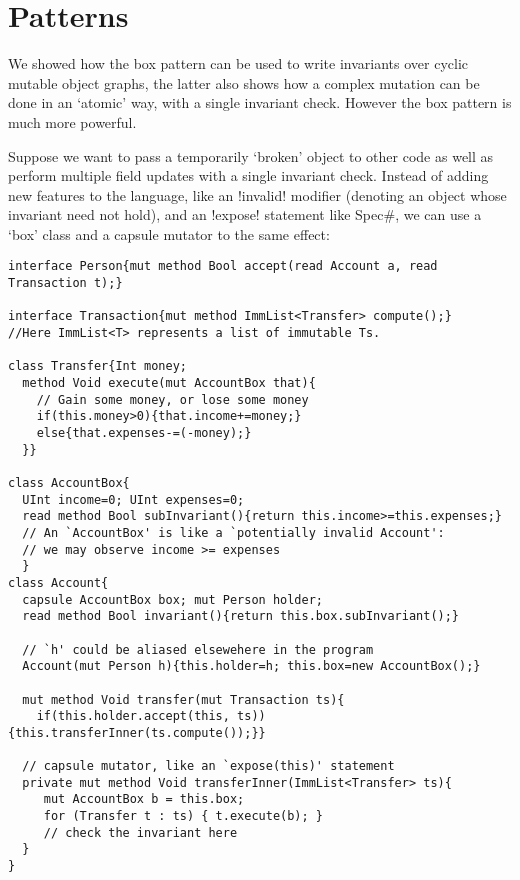 \section{Patterns}
\label{s:patterns}


We showed how the box pattern can be used to write invariants over cyclic mutable object graphs, the latter also shows how a complex mutation can be done in an `atomic' way, with a single invariant check. However the box pattern is much more powerful.

 Suppose we want to pass a temporarily `broken' object to other code as well as perform multiple field updates with a single invariant check. 
Instead of adding new features to the language, like an \Q!invalid! modifier (denoting an object whose invariant need not hold), and an \Q!expose! statement like Spec\#, we can use a `box' class and a capsule mutator to the same effect:
\begin{lstlisting}
interface Person{mut method Bool accept(read Account a, read Transaction t);}

interface Transaction{mut method ImmList<Transfer> compute();}
//Here ImmList<T> represents a list of immutable Ts.

class Transfer{Int money;
  method Void execute(mut AccountBox that){
    // Gain some money, or lose some money
    if(this.money>0){that.income+=money;}
    else{that.expenses-=(-money);}
  }}

class AccountBox{
  UInt income=0; UInt expenses=0;
  read method Bool subInvariant(){return this.income>=this.expenses;}
  // An `AccountBox' is like a `potentially invalid Account':
  // we may observe income >= expenses
  }
class Account{
  capsule AccountBox box; mut Person holder;
  read method Bool invariant(){return this.box.subInvariant();}

  // `h' could be aliased elsewehere in the program    
  Account(mut Person h){this.holder=h; this.box=new AccountBox();}

  mut method Void transfer(mut Transaction ts){
    if(this.holder.accept(this, ts)){this.transferInner(ts.compute());}}

  // capsule mutator, like an `expose(this)' statement
  private mut method Void transferInner(ImmList<Transfer> ts){
     mut AccountBox b = this.box;
     for (Transfer t : ts) { t.execute(b); }
     // check the invariant here
  }
}
\end{lstlisting}
